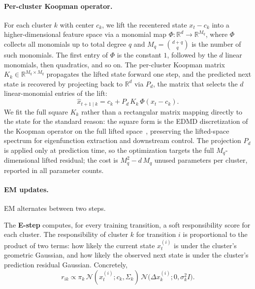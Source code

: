 \documentclass{article}
\begin{document}
\paragraph{Per-cluster Koopman operator.} For each cluster $k$ with center $c_k$, we lift 
the recentered state $x_t - c_k$ into a higher-dimensional feature space via a monomial map 
$\Phi: \mathbb{R}^d \to \mathbb{R}^{M_q}$, where $\Phi$ collects all monomials up to total 
degree $q$ and $M_q = \binom{d+q}{q}$ is the number of such monomials. The first entry of 
$\Phi$ is the constant $1$, followed by the $d$ linear monomials, then quadratics, and so 
on. The per-cluster Koopman matrix $K_k \in \mathbb{R}^{M_q \times M_q}$ propagates the 
lifted state forward one step, and the predicted next state is recovered by projecting back 
to $\mathbb{R}^d$ via $P_d$, the matrix that selects the $d$ linear-monomial entries of the 
lift:
\[
\hat{x}_{t+1\mid k} = c_k + P_d\, K_k\, \Phi(x_t - c_k).
\]
We fit the full square $K_k$ rather than a rectangular matrix mapping directly to the state 
for the standard reason: the square form is the EDMD discretization of the Koopman operator 
on the full lifted space~\citep{williams2015edmd,brunton2022modern}, preserving the 
lifted-space spectrum for eigenfunction extraction and downstream control. The projection 
$P_d$ is applied only at prediction time, so the optimization targets the full 
$M_q$-dimensional lifted residual; the cost is $M_q^2 - d\,M_q$ unused parameters per 
cluster, reported in all parameter counts.


\paragraph{EM updates.}\label{par:em-updates} EM alternates between two steps.

The \textbf{E-step} computes, for every training transition, a soft responsibility score 
for each cluster. The responsibility of cluster $k$ for transition $i$ is proportional to 
the product of two terms: how likely the current state $x_t^{(i)}$ is under the cluster's 
geometric Gaussian, and how likely the observed next state is under the cluster's prediction 
residual Gaussian. Concretely,
\[
r_{ik} \propto \pi_k\, \mathcal{N}(x_t^{(i)}; c_k, \Sigma_k)\, 
\mathcal{N}\!\bigl(\Delta x_k^{(i)}; 0, \sigma_k^2 I\bigr).
\]
\end{document}
